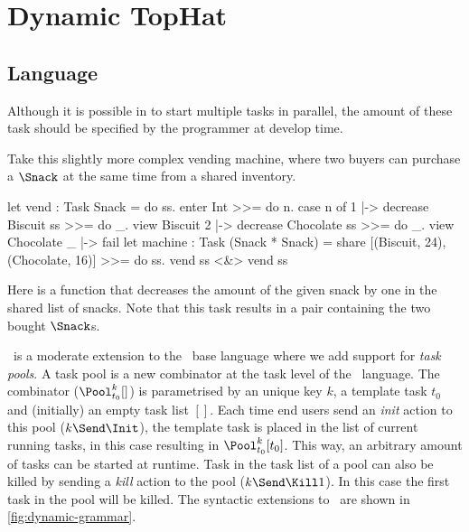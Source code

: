 
\section{Dynamic TopHat}

\subsection{Language}

Although it is possible in \TOPHAT to start multiple tasks in parallel,
the amount of these task should be specified by the programmer at develop time.

\begin{example}
  \label{exm:vending-shared}
  Take this slightly more complex vending machine,
  where two buyers can purchase a $\Snack$ at the same time from a shared inventory.

  \begin{TASK}[]
    let vend : Task Snack = do ss.
      enter Int >>= do n.
      case n of
        1 |-> decrease Biscuit ss >>= do _.
             view Biscuit
        2 |-> decrease Chocolate ss >>= do _.
             view Chocolate
        _ |-> fail
    let machine : Task (Snack * Snack) =
      share [(Biscuit, 24), (Chocolate, 16)] >>= do ss.
      vend ss <&> vend ss
  \end{TASK}

  Here  is a function that decreases the amount of the given snack by one in the shared list of snacks.
  Note that this task results in a pair containing the two bought $\Snack$s.
\end{example}

\DYNTOPHAT\ is a moderate extension to the \TOPHAT\ base language where we add support for \emph{task pools}.
A task pool is a new combinator at the task level of the \TOPHAT\ language.
The combinator ($\Pool^k_{t_0} []$) is parametrised by an unique key $k$, a template task $t_0$ and (initially) an empty task list $[]$.
Each time end users send an \emph{init} action to this pool ($k\Send\Init$),
the template task is placed in the list of current running tasks,
in this case resulting in $\Pool^k_{t_0} [t_0]$.
This way, an arbitrary amount of tasks can be started at runtime.
Task in the task list of a pool can also be killed by sending a \emph{kill} action to the pool ($k\Send\Kill1$).
In this case the first task in the pool will be killed.
The syntactic extensions to \TOPHAT\ are shown in \cref{fig:dynamic-grammar}.

